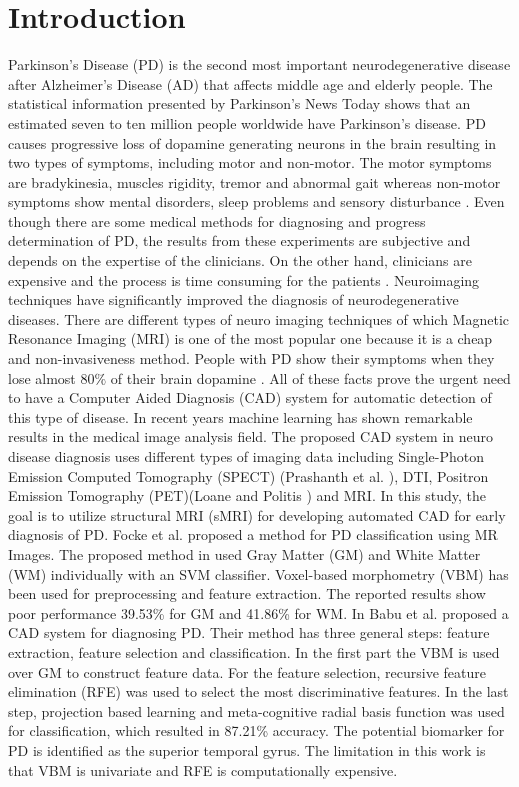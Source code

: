 \documentclass[runningheads,a4paper]{llncs}
\begin{document}
\section{Introduction}
Parkinson's Disease (PD) is the second most important neurodegenerative disease after Alzheimer's Disease (AD) that affects middle age and elderly people. The statistical information presented by Parkinson’s News Today \cite{1} shows that an estimated seven to ten million people worldwide have Parkinson’s disease. PD causes progressive loss of dopamine generating neurons in the brain resulting in two types of symptoms, including motor and non-motor. The motor symptoms are bradykinesia, muscles rigidity, tremor and abnormal gait \cite{2} whereas non-motor symptoms show mental disorders, sleep problems and sensory disturbance \cite{3}.
Even though there are some medical methods for diagnosing and progress determination of PD, the results from these experiments are subjective and depends on the expertise of the clinicians. On the other hand, clinicians are expensive and the process is time consuming for the patients \cite{4}. Neuroimaging techniques have significantly improved the diagnosis of neurodegenerative  diseases. There are different types of neuro imaging techniques of which Magnetic Resonance Imaging (MRI) is one of the most popular one because it is a cheap and non-invasiveness method. People with PD show their symptoms when they lose almost $80\%$ of their brain dopamine \cite{5}. All of these facts prove the urgent need to have a Computer Aided Diagnosis (CAD) system for automatic detection of this type of disease.
In recent years machine learning has shown remarkable results in the medical image analysis field. The proposed CAD system in neuro disease diagnosis uses different types of imaging data including Single-Photon Emission Computed Tomography (SPECT) (Prashanth et al. \cite{6}), DTI, Positron Emission Tomography (PET)(Loane and Politis \cite{7}) and MRI. In this study, the goal is to utilize structural MRI (sMRI) for developing automated CAD for early diagnosis of PD. Focke et al. \cite{8} proposed a method for PD classification using MR Images. The proposed method in \cite{8} used Gray Matter (GM) and White Matter (WM) individually with an SVM classifier. Voxel-based morphometry (VBM) has been used for preprocessing and feature extraction. The reported results show poor performance 39.53\% for GM and 41.86\% for WM. In \cite{9} Babu et al. proposed a CAD system for diagnosing PD. Their method has three general steps: feature extraction, feature selection and classification. In the first part the VBM is used over GM to construct feature data. For the feature selection, recursive feature elimination (RFE) was used to select the most discriminative features. In the last step,  projection based learning and meta-cognitive radial basis function was used for classification, which resulted in 87.21\% accuracy. The potential biomarker for PD is identified as the superior temporal gyrus. The limitation in this work is that VBM is univariate and RFE is computationally expensive.
\end{document}

